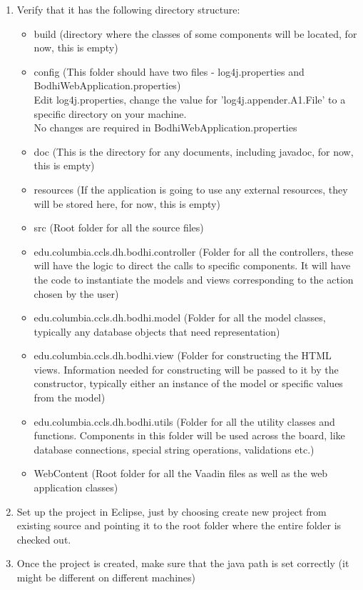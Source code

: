 \documentclass[amsart, 12pt]{article}
\begin{document}
\begin{enumerate}
\item Verify that it has the following directory structure:
\begin{itemize}
    \item build (directory where the classes of some components will be located, for now, this is empty)
\item config (This folder should have two files - log4j.properties and BodhiWebApplication.properties)\\
Edit log4j.properties, change the value for 'log4j.appender.A1.File' to a specific directory on your machine.\\
No changes are required in BodhiWebApplication.properties
\item doc (This is the directory for any documents, including javadoc, for now, this is empty)
\item resources (If the application is going to use any external resources, they will be stored here, for now, this is empty)
\item src (Root folder for all the source files)
\item edu.columbia.ccls.dh.bodhi.controller (Folder for all the controllers, these will have the logic to direct the calls to specific components. It will have the code to instantiate the models and views corresponding to the action chosen by the user)
\item edu.columbia.ccls.dh.bodhi.model (Folder for all the model classes, typically any database objects that need representation)
\item edu.columbia.ccls.dh.bodhi.view (Folder for constructing the HTML views. Information needed for constructing will be passed to it by the constructor, typically either an instance of the model or specific values from the model)
\item edu.columbia.ccls.dh.bodhi.utils (Folder for all the utility classes and functions. Components in this folder will be used across the board, like database connections, special string operations, validations etc.)
\item WebContent (Root folder for all the Vaadin files as well as the web application classes)
\end{itemize}

\item Set up the project in Eclipse, just by choosing create new project from existing source and pointing it to the root folder where the entire folder is checked out.

\item Once the project is created, make sure that the java path is set correctly (it might be different on different machines)


\end{enumerate}
\end{document}
